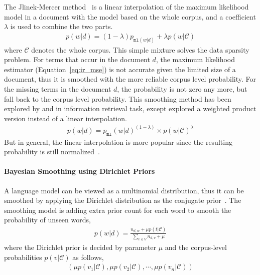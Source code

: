 The Jlinek-Mercer method~\citep{Jelinek-1980} is a linear
interpolation of the maximum likelihood model in a document with the
model based on the whole corpus, and a coefficient $\lambda$ is used
to combine the two parts.
\begin{align}
p(w|d) = (1 - \lambda) p_{\texttt{ml}(w|d)} + \lambda p(w|\mathcal{C})
\end{align}
where $\mathcal{C}$ denotes the whole corpus. This simple mixture
solves the data sparsity problem. For terms that occur in the document
$d$, the maximum likelihood estimator (Equation~\ref{eq:ir_mse}) is
not accurate given the limited size of a document, thus it is smoothed
with the more reliable corpus level probability. For the missing terms
in the document $d$, the probability is not zero any more, but fall
back to the corpus level probability. This smoothing method has been
explored by \cite{PonteCroft} and \cite{song-99} in information
retrieval task, except \cite{PonteCroft} explored a weighted product
version instead of a linear interpolation.
\begin{align}
p(w|d) = p_{\texttt{ml}}(w|d)^{(1 - \lambda) } \times p(w|\mathcal{C})^{\lambda}
\label{eq:lm-jr}
\end{align}
But in general, the linear interpolation is more popular since the
resulting probability is still normalized~\citep{song-99}.

\paragraph{Bayesian Smoothing using Dirichlet Priors}

A language model can be viewed as a multinomial distribution, thus it
can be smoothed by applying the Dirichlet distribution as the
conjugate prior~\citep{mackay95dirichlet}. The smoothing model is
adding extra prior count for each word to smooth the probability of
unseen words,
\begin{align}
p(w|d) = \frac{n_{d,w} + \mu p(t|\mathcal{C})}{\sum_{v \in V} n_{d,v} + \mu}
\end{align}
where the Dirichlet prior is decided by parameter $\mu$ and the
corpus-level probabilities $p(v|\mathcal{C})$ as follows,
\begin{align}
(\mu p(v_1 | \mathcal{C}), \mu p(v_2 | \mathcal{C}), \cdots, \mu p(v_n | \mathcal{C}))
\label{eq:lm-bs}
\end{align}



